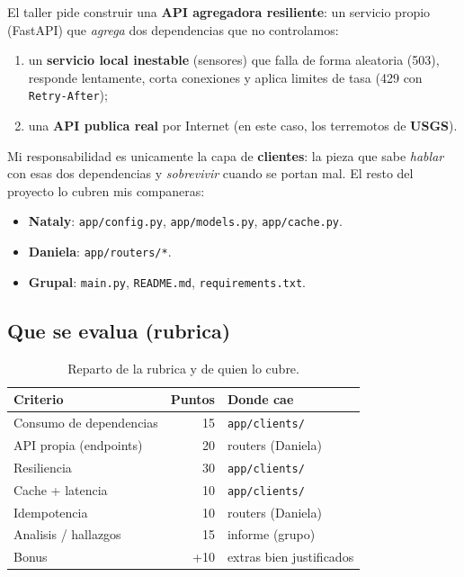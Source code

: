 \documentclass[11pt,a4paper]{article}
\newcommand{\arch}[1]{\texttt{#1}}
\begin{document}
El taller pide construir una \textbf{API agregadora resiliente}: un servicio
propio (FastAPI) que \emph{agrega} dos dependencias que no controlamos:

\begin{enumerate}
  \item un \textbf{servicio local inestable} (sensores) que falla de forma
        aleatoria (503), responde lentamente, corta conexiones y aplica
        limites de tasa (429 con \arch{Retry-After});
  \item una \textbf{API publica real} por Internet (en este caso, los
        terremotos de \textbf{USGS}).
\end{enumerate}

Mi responsabilidad es unicamente la capa de \textbf{clientes}: la pieza que
sabe \emph{hablar} con esas dos dependencias y \emph{sobrevivir} cuando se
portan mal. El resto del proyecto lo cubren mis companeras:

\begin{itemize}
  \item \textbf{Nataly}: \arch{app/config.py}, \arch{app/models.py},
        \arch{app/cache.py}.
  \item \textbf{Daniela}: \arch{app/routers/*}.
  \item \textbf{Grupal}: \arch{main.py}, \arch{README.md},
        \arch{requirements.txt}.
\end{itemize}

\subsection{Que se evalua (rubrica)}
\begin{table}[H]
\centering
\begin{tabular}{lr l}
\toprule
\textbf{Criterio} & \textbf{Puntos} & \textbf{Donde cae} \\
\midrule
Consumo de dependencias          & 15 & \arch{app/clients/} \\
API propia (endpoints)           & 20 & routers (Daniela) \\
Resiliencia                      & 30 & \arch{app/clients/} \\
Cache + latencia                 & 10 & \arch{app/clients/} \\
Idempotencia                     & 10 & routers (Daniela) \\
Analisis / hallazgos             & 15 & informe (grupo) \\
\midrule
Bonus                            & +10 & extras bien justificados \\
\bottomrule
\end{tabular}
\caption{Reparto de la rubrica y de quien lo cubre.}
\end{table}
\end{document}
